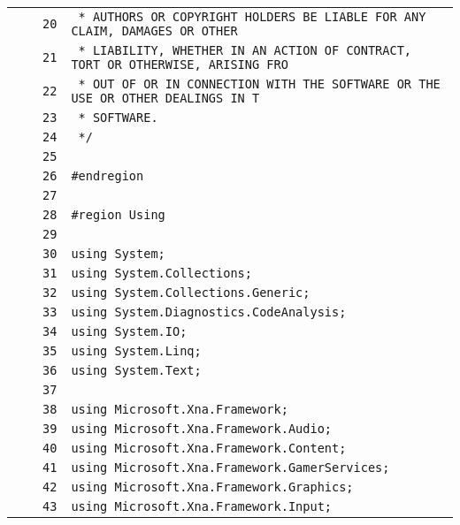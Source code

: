 \documentclass[a4paper,10pt]{article}
\begin{document}
\begin{longtable}[l]{lrrl}
\cellcolor{gray} &  & \verb~20~ & \verb~ * AUTHORS OR COPYRIGHT HOLDERS BE LIABLE FOR ANY CLAIM, DAMAGES OR OTHER~\\
\cellcolor{gray} &  & \verb~21~ & \verb~ * LIABILITY, WHETHER IN AN ACTION OF CONTRACT, TORT OR OTHERWISE, ARISING FRO~\\
\cellcolor{gray} &  & \verb~22~ & \verb~ * OUT OF OR IN CONNECTION WITH THE SOFTWARE OR THE USE OR OTHER DEALINGS IN T~\\
\cellcolor{gray} &  & \verb~23~ & \verb~ * SOFTWARE.~\\
\cellcolor{gray} &  & \verb~24~ & \verb~ */~\\
\cellcolor{gray} &  & \verb~25~ & \verb~~\\
\cellcolor{gray} &  & \verb~26~ & \verb~#endregion~\\
\cellcolor{gray} &  & \verb~27~ & \verb~~\\
\cellcolor{gray} &  & \verb~28~ & \verb~#region Using~\\
\cellcolor{gray} &  & \verb~29~ & \verb~~\\
\cellcolor{gray} &  & \verb~30~ & \verb~using System;~\\
\cellcolor{gray} &  & \verb~31~ & \verb~using System.Collections;~\\
\cellcolor{gray} &  & \verb~32~ & \verb~using System.Collections.Generic;~\\
\cellcolor{gray} &  & \verb~33~ & \verb~using System.Diagnostics.CodeAnalysis;~\\
\cellcolor{gray} &  & \verb~34~ & \verb~using System.IO;~\\
\cellcolor{gray} &  & \verb~35~ & \verb~using System.Linq;~\\
\cellcolor{gray} &  & \verb~36~ & \verb~using System.Text;~\\
\cellcolor{gray} &  & \verb~37~ & \verb~~\\
\cellcolor{gray} &  & \verb~38~ & \verb~using Microsoft.Xna.Framework;~\\
\cellcolor{gray} &  & \verb~39~ & \verb~using Microsoft.Xna.Framework.Audio;~\\
\cellcolor{gray} &  & \verb~40~ & \verb~using Microsoft.Xna.Framework.Content;~\\
\cellcolor{gray} &  & \verb~41~ & \verb~using Microsoft.Xna.Framework.GamerServices;~\\
\cellcolor{gray} &  & \verb~42~ & \verb~using Microsoft.Xna.Framework.Graphics;~\\
\cellcolor{gray} &  & \verb~43~ & \verb~using Microsoft.Xna.Framework.Input;~\\

\end{longtable}
\end{document}
